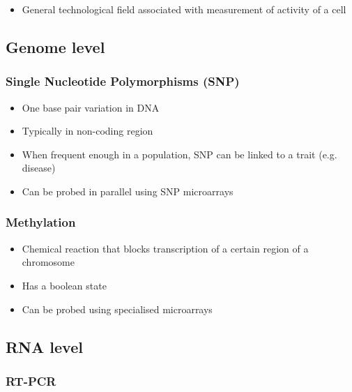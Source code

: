 \documentclass[a4paper]{article}
\begin{document}
\begin{itemize}
  \item
    General technological field associated with measurement of activity of a
    cell
\end{itemize}

\subsection{Genome level}

\subsubsection{Single Nucleotide Polymorphisms (SNP)}

\begin{itemize}
  \item
    One base pair variation in DNA

  \item
    Typically in non-coding region

  \item
    When frequent enough in a population, SNP can be linked to a trait (e.g.
    disease)

  \item
    Can be probed in parallel using SNP microarrays
\end{itemize}

\subsubsection{Methylation}

\begin{itemize}
  \item
    Chemical reaction that blocks transcription of a certain region of a
    chromosome

  \item
    Has a boolean state

  \item
    Can be probed using specialised microarrays
\end{itemize}

\subsection{RNA level}

\subsubsection{RT-PCR}
\end{document}
